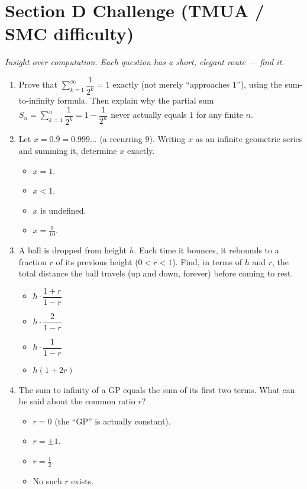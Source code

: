 \documentclass[11pt,a4paper]{article}
\begin{document}
\section*{Section D \quad Challenge \hfill{\normalfont\small(TMUA / SMC difficulty)}}

\noindent\textit{Insight over computation. Each question has a short, elegant route --- find it.}

\begin{enumerate}

\item Prove that $\displaystyle\sum_{k=1}^\infty\dfrac1{2^k}=1$ exactly (not merely ``approaches $1$''), using the sum-to-infinity formula. Then explain why the partial sum $S_n=\sum_{k=1}^n\dfrac1{2^k}=1-\dfrac1{2^n}$ never actually equals $1$ for any finite $n$.

\item Let $x=0.\overline9=0.999\ldots$ (a recurring $9$). Writing $x$ as an infinite geometric series and summing it, determine $x$ exactly.
\begin{itemize}
\item[A)] $x=1$.
\item[B)] $x < 1$.
\item[C)] $x$ is undefined.
\item[D)] $x=\tfrac9{10}$.
\end{itemize}

\item A ball is dropped from height $h$. Each time it bounces, it rebounds to a fraction $r$ of its previous height ($0<r<1$). Find, in terms of $h$ and $r$, the total distance the ball travels (up and down, forever) before coming to rest.
\begin{itemize}
\item[A)] $h\cdot\dfrac{1+r}{1-r}$
\item[B)] $h\cdot\dfrac2{1-r}$
\item[C)] $h\cdot\dfrac1{1-r}$
\item[D)] $h(1+2r)$
\end{itemize}

\item The sum to infinity of a GP equals the sum of its first two terms. What can be said about the common ratio $r$?
\begin{itemize}
\item[A)] $r=0$ (the ``GP'' is actually constant).
\item[B)] $r=\pm1$.
\item[C)] $r=\tfrac12$.
\item[D)] No such $r$ exists.
\end{itemize}


\end{enumerate}
\end{document}
